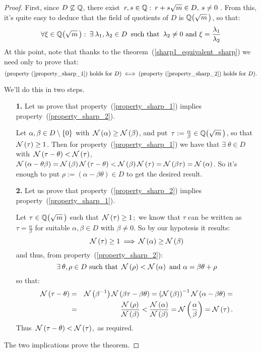 \begin{proof}
%
First, since $D \not \subseteq \Q$, there exist\,
$r,s \in \Q:\: r + s\sqrt{m} \in D,\: s \ne 0$ .
From this, it's quite easy to deduce that the field of
quotients of $D$ is $\QQ{m}$, so that:
$$
\forall \xi \in \QQ{m}:\: \exists\: \lambda_1,
\lambda_2 \in D\ \,\textrm{such\ that}\, \ \lambda_2
\ne 0\ \textrm{and}\ \xi = \frac{\lambda_1}{\lambda_2}
$$
%
At this point, note that thanks to the
theorem~(\ref{sharp1_equivalent_sharp})
we need only to prove that:
\begin{equation*}
\textrm{(property~(\ref{property_sharp_1}) holds for $D$)}
\iff
\textrm{(property~(\ref{property_sharp_2}) holds for $D$)}.
\end{equation*}

We'll do this in two steps.

\begin{enumerate}

\item[\textbf{1.}]
Let us prove that property~(\ref{property_sharp_1})
implies property~(\ref{property_sharp_2}).

Let $\alpha,\beta \in D\minz$ with\, $\Norm\alpha \geq \Norm\beta$,
and put\, $\tau:= \frac{\alpha}{\beta} \in \QQ{m}$, so that
\,$\Norm\tau \geq 1$.
Then for property~(\ref{property_sharp_1}) we have that
$\exists\; \theta \in D$\, with\,
$\Norm{\tau - \theta} < \Norm{\tau}$, \ie
$\Norm{\alpha - \theta\beta} = \Norm{\beta}\Norm{\tau - \theta}
< \Norm{\beta}\Norm{\tau} = \Norm{\beta\tau} = \Norm{\alpha}$.
So it's enough to put $\rho:= (\alpha - \beta\theta) \in D$
to get the desired result.

\item[\textbf{2.}]
Let us prove that property~(\ref{property_sharp_2})
implies property~(\ref{property_sharp_1}).

Let $\tau \in \QQ{m}$ such that\, $\Norm{\tau} \geq 1$;\,
we know that $\tau$ can be written as
$\tau = \frac{\alpha}{\beta}$ for suitable $\alpha,\beta
\in D$ with $\beta \neq 0$. So by our hypotesis it results:
$$ \Norm{\tau} \geq 1 \then \Norm{\alpha} \geq \Norm{\beta} $$
and thus, from property~(\ref{property_sharp_2}):
$$
\exists\: \theta,\rho \in D \textrm{ such that }\,
\Norm{\rho} < \Norm{\alpha} \textrm{ and }
\alpha = \beta\theta + \rho
$$
so that:
\begin{eqnarray*}
\Norm{\tau - \theta} & = &
\Norm{\beta^{-1}} \Norm{\beta\tau - \beta\theta} =
\left(\Norm{\beta}\right)^{-1}
\Norm{\alpha - \beta\theta} = \\
& = & \frac{\Norm{\rho}}{\Norm{\beta}} <
\frac{\Norm{\alpha}}{\Norm{\beta}} =
\Norm{\frac{\alpha}{\beta}} = \Norm{\tau}.
\end{eqnarray*}
Thus\, $\Norm{\tau - \theta} < \Norm{\tau}$,\,
as required.
\end{enumerate}
The two implications prove the theorem.
%
\end{proof}


